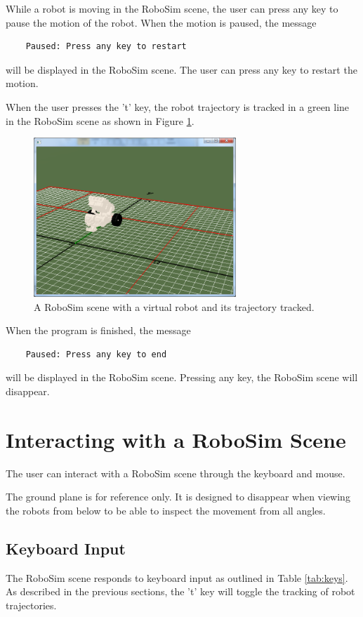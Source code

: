 \documentclass{article}
\begin{document}
While a robot is moving in the RoboSim scene, the user can press any key to
pause the motion of the robot.  When the motion is paused, the message
\begin{verbatim}
    Paused: Press any key to restart
\end{verbatim}
will be displayed in the RoboSim scene. The user can press any key to restart
the motion.

When the user presses the 't' key, the robot trajectory is tracked in a green
line in the RoboSim scene as shown in Figure \ref{fig:robosim_tracked}.
\begin{figure}[H]
	\begin{center}
		\includegraphics[width=3in]{pictures/robosim_tracked}
	\end{center}
	\caption{A RoboSim scene with a virtual robot and its trajectory tracked.}
	\label{fig:robosim_tracked}
\end{figure}

When the program is finished, the message
\begin{verbatim}
    Paused: Press any key to end
\end{verbatim}
will be displayed in the RoboSim scene.  Pressing any key, the RoboSim scene
will disappear.

%
%
\section{Interacting with a RoboSim Scene}
The user can interact with a RoboSim scene through the keyboard and mouse.

The ground plane is for reference only.  It is designed to disappear when
viewing the robots from below to be able to inspect the movement from all
angles.

\subsection{Keyboard Input}
The RoboSim scene responds to keyboard input as outlined in Table
\ref{tab:keys}.  As described in the previous sections, the 't' key will toggle
the tracking of robot trajectories.
\end{document}
